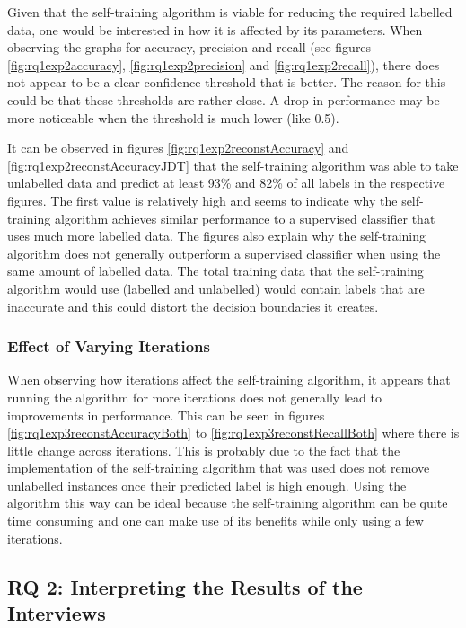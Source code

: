 \documentclass[../main.tex]{subfiles}
\begin{document}
Given that the self-training algorithm is viable for reducing the required labelled data, one would be interested in how it is affected by its parameters. When observing the graphs for accuracy, precision and recall (see figures \ref{fig:rq1exp2accuracy}, \ref{fig:rq1exp2precision} and \ref{fig:rq1exp2recall}), there does not appear to be a clear confidence threshold that is better. The reason for this could be that these thresholds are rather close. A drop in performance may be more noticeable when the threshold is much lower (like 0.5). 

It can be observed in figures \ref{fig:rq1exp2reconstAccuracy} and \ref{fig:rq1exp2reconstAccuracyJDT} that the self-training algorithm was able to take unlabelled data and predict at least 93\% and 82\% of all labels in the respective figures. The first value is relatively high and seems to indicate why the self-training algorithm achieves similar performance to a supervised classifier that uses much more labelled data. The figures also explain why the self-training algorithm does not generally outperform a supervised classifier when using the same amount of labelled data. The total training data that the self-training algorithm would use (labelled and unlabelled) would contain labels that are inaccurate and this could distort the decision boundaries it creates. 

\subsubsection{Effect of Varying Iterations}

When observing how iterations affect the self-training algorithm, it appears that running the algorithm for more iterations does not generally lead to improvements in performance. This can be seen in figures \ref{fig:rq1exp3reconstAccuracyBoth} to \ref{fig:rq1exp3reconstRecallBoth} where there is little change across iterations. This is probably due to the fact that the implementation of the self-training algorithm that was used does not remove unlabelled instances once their predicted label is high enough. Using the algorithm this way can be ideal because the self-training algorithm can be quite time consuming and one can make use of its benefits while only using a few iterations. 

\subsection{RQ 2: Interpreting the Results of the Interviews}
\end{document}
